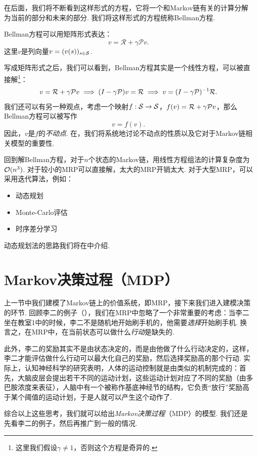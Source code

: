 在后面，我们将不断看到这样形式的方程，它将一个和Markov链有关的计算分解为当前的部分和未来的部分. 我们将这样形式的方程统称Bellman方程. 

Bellman方程可以用矩阵形式表达：
        \[v = \mathcal R + \gamma \mathcal P v.\]
这里$v$是列向量$v=(v(s))_{s\in\mathcal S}$.

写成矩阵形式之后，我们可以看到，Bellman方程其实是一个线性方程，可以被直接解\footnote{这里我们假设$\gamma\neq 1$，否则这个方程是奇异的.}：
\[
    v =\mathcal R + \gamma \mathcal P v \implies (I-\gamma \mathcal P)v = \mathcal R \implies v = (I-\gamma \mathcal P)^{-1} \mathcal R.
\]
我们还可以有另一种观点，考虑一个映射$f:\mathcal S\to \mathcal S$，$f(v)=\mathcal R + \gamma \mathcal P v$，那么Bellman方程可以被写作
\[v=f(v).\]
因此，$v$是$f$的\emph{不动点}. 在，我们将系统地讨论不动点的性质以及它对于Markov链相关模型的重要性.

回到解Bellman方程，对于$n$个状态的Markov链，用线性方程组法的计算复杂度为$\mathcal{O}(n^3)$. 对于较小的MRP可以直接解，太大的MRP开销太大. 对于大型MRP，可以采用迭代算法，例如：
\begin{itemize}
    \item 动态规划
    \item Monte-Carlo评估
    \item 时序差分学习
\end{itemize}
动态规划法的思路我们将在中介绍.

\section{Markov决策过程（MDP）}\label{sec:MDP}

上一节中我们建模了Markov链上的价值系统，即MRP，接下来我们进入建模决策的环节. 回顾李二的例子（），我们在MRP中忽略了一个非常重要的考虑：当李二坐在教室1中的时候，李二不是随机地开始刷手机的，他需要\emph{选择}开始刷手机. 换言之，在MRP中，在当前状态可以做什么\emph{行动}是缺失的. 

此外，李二的奖励其实不是由状态决定的，而是由他做了什么行动决定的，这样，李二才能评估做什么行动可以最大化自己的奖励，然后选择奖励高的那个行动. 实际上，认知神经科学的研究表明，人体的运动控制就是由类似的机制完成的：首先，大脑皮层会提出若干不同的运动计划，这些运动计划对应了不同的奖励（由多巴胺浓度来表征），人脑中有一个被称作基底神经节的结构，它负责“放行”奖励高于某个阈值的运动计划，于是人就可以产生这个动作了. 

综合以上这些思考，我们就可以给出\emph{Markov决策过程}（MDP）的模型. 我们还是先看李二的例子，然后再推广到一般的情况. 

